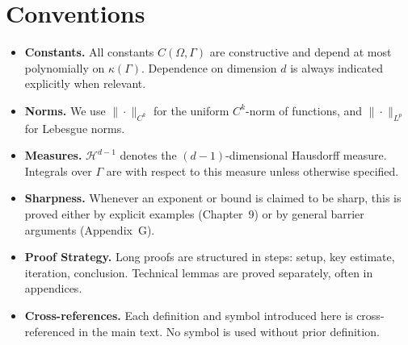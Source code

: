 \section*{Conventions}

\begin{itemize}
    \item \textbf{Constants.}  
    All constants $C(\Omega,\Gamma)$ are constructive and depend at most polynomially on $\kappa(\Gamma)$.  
    Dependence on dimension $d$ is always indicated explicitly when relevant.

    \item \textbf{Norms.}  
    We use $\| \cdot \|_{C^k}$ for the uniform $C^k$-norm of functions, and $\| \cdot \|_{L^p}$ for Lebesgue norms.

    \item \textbf{Measures.}  
    $\mathcal{H}^{d-1}$ denotes the $(d-1)$-dimensional Hausdorff measure. Integrals over $\Gamma$ are with respect to this measure unless otherwise specified.

    \item \textbf{Sharpness.}  
    Whenever an exponent or bound is claimed to be sharp, this is proved either by explicit examples (Chapter~9) or by general barrier arguments (Appendix~G).

    \item \textbf{Proof Strategy.}  
    Long proofs are structured in steps: setup, key estimate, iteration, conclusion. Technical lemmas are proved separately, often in appendices.

    \item \textbf{Cross-references.}  
    Each definition and symbol introduced here is cross-referenced in the main text. No symbol is used without prior definition.
\end{itemize}

